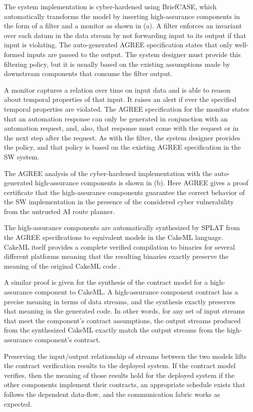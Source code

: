 The system implementation is cyber-hardened using BriefCASE, which automatically transforms the model by inserting high-assurance components in the form of a filter and a monitor as shown in (a). A filter enforces an invariant over each datum in the data stream by not forwarding input to its output if that input is violating. The auto-generated AGREE specification states that only well-formed inputs are passed to the output. The system designer must provide this filtering policy, but it is usually based on the existing assumptions made by downstream components that consume the filter output. 

A monitor captures a relation over time on input data and is able to reason about temporal properties of that input. It raises an alert if ever the specified temporal properties are violated. The AGREE specification for the monitor states that an automation response can only be generated in conjunction with an automation request, and, also,  that response must come with the request or in the next step after the request. As with the filter, the system designer provides the policy, and that policy is based on the existing AGREE specification in the SW system.

The AGREE analysis of the cyber-hardened implementation with the auto-generated high-assurance components is shown in (b). Here AGREE gives a proof certificate that the high-assurance components guarantee the correct behavior of the SW implementation in the presence of the considered cyber vulnerability from the untrusted AI route planner.

The high-assurance components are automatically synthesized by SPLAT from the AGREE specifications to equivalent models in the CakeML language. CakeML itself provides a complete verified compilation to binaries for several different platforms meaning that the resulting binaries exactly preserve the meaning of the original CakeML code \cite{cakeml}. 

A similar proof is given for the synthesis of the contract model for a high-assurance component to CakeML. A high-assurance component contract has a precise meaning in terms of data streams, and the synthesis exactly preserves that meaning in the generated code. In other words, for any set of input streams that meet the component's contract assumptions, the output streams produced from the synthesized CakeML exactly match the output streams from the high-assurance component's contract. 

Preserving the input/output relationship of streams between the two models lifts the contract verification results to the deployed system. If the contract model verifies, then the meaning of those results hold for the deployed system if the other components implement their contracts, an appropriate schedule exists that follows the dependent data-flow, and the communication fabric works as expected.